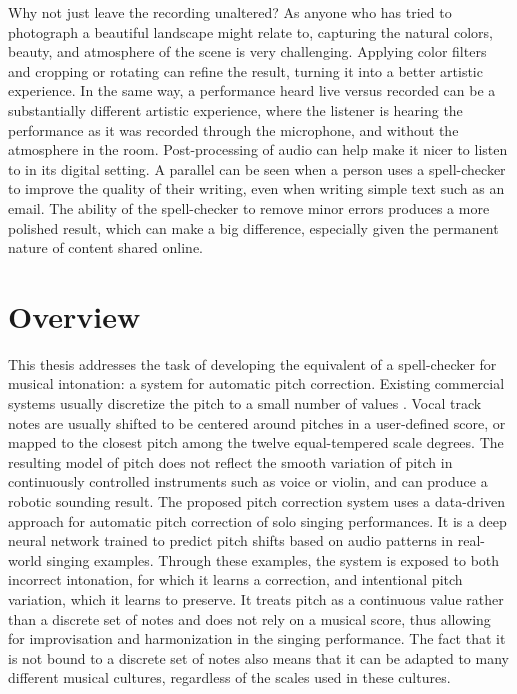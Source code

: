 Why not just leave the recording unaltered? As anyone who has tried to photograph a beautiful landscape might relate to, capturing the natural colors, beauty, and atmosphere of the scene is very challenging. Applying color filters and cropping or rotating can refine the result, turning it into a better artistic experience. In the same way, a performance heard live versus recorded can be a substantially different artistic experience, where the listener is hearing the performance as it was recorded through the microphone, and without the atmosphere in the room. Post-processing of audio can help make it nicer to listen to in its digital setting. A parallel can be seen when a person uses a spell-checker to improve the quality of their writing, even when writing simple text such as an email. The ability of the spell-checker to remove minor errors produces a more polished result, which can make a big difference, especially given the permanent nature of content shared online. %

\section{Overview}
This thesis addresses the task of developing the equivalent of a spell-checker for musical intonation: a system for automatic pitch correction. Existing commercial systems usually discretize the pitch to a small number of values \cite{antares:2016}. Vocal track notes are usually shifted to be centered around pitches in a user-defined score, or mapped to the closest pitch among the twelve equal-tempered scale degrees. The resulting model of pitch does not reflect the smooth variation of pitch in continuously controlled instruments such as voice or violin, and can produce a robotic sounding result. The proposed pitch correction system uses a data-driven approach for automatic pitch correction of solo singing performances. It is a deep neural network trained to predict pitch shifts based on audio patterns in real-world singing examples. Through these examples, the system is exposed to both incorrect intonation, for which it learns a correction, and intentional pitch variation, which it learns to preserve. It treats pitch as a continuous value rather than a discrete set of notes and does not rely on a musical score, thus allowing for improvisation and harmonization in the singing performance. The fact that it is not bound to a discrete set of notes also means that it can be adapted to many different musical cultures, regardless of the scales used in these cultures. 

